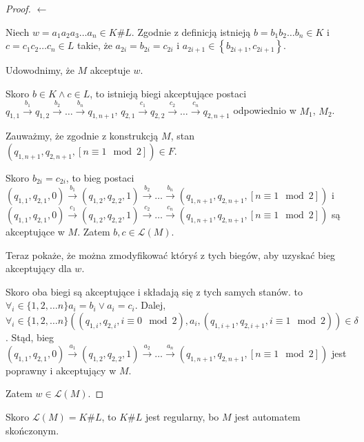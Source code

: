 \documentclass{article}
\theoremstyle{definition}
\theoremstyle{remark}
\begin{document}
\begin{proof}
    \(\leftarrow\)

    Niech \(w = a_1 a_2 a_3\ldots a_n \in K \# L\). Zgodnie z definicją istnieją \(b=b_1 b_2 \ldots b_n \in K\) i \(c=c_1 c_2 \ldots c_n \in L\) takie,
    że \(a_{2i} = b_{2i} = c_{2i}\) i \(a_{2i+1} \in \left\{ b_{2i+1}, c_{2i+1} \right\}\).

    Udowodnimy, że \(M\) akceptuje \(w\).

    Skoro \(b \in K \land c \in L\), to istnieją biegi akceptujące postaci \(q_{1,1} \xrightarrow{b_1} q_{1,2} \xrightarrow{b_2} \ldots \xrightarrow{b_n} q_{1,n+1}\),
    \(q_{2,1} \xrightarrow{c_1} q_{2,2} \xrightarrow{c_2} \ldots \xrightarrow{c_n} q_{2,n+1}\) odpowiednio w \(M_1\), \(M_2\).

    Zauważmy, że zgodnie z konstrukcją \(M\), stan \( \left( q_{1,n+1}, q_{2,n+1}, \left[ n \equiv 1 \mod 2 \right] \right) \in F\).
    
    Skoro \(b_{2i} = c_{2i}\), to bieg postaci
    \( \left(q_{1,1}, q_{2,1}, 0 \right) \xrightarrow{b_1} \left(q_{1,2}, q_{2,2}, 1 \right) \xrightarrow{b_2} \ldots \xrightarrow{b_n} \left(q_{1,n+1}, q_{2,n+1}, \left[ n \equiv 1 \mod 2  \right] \right) \)
    i
    \( \left(q_{1,1}, q_{2,1}, 0 \right) \xrightarrow{c_1} \left(q_{1,2}, q_{2,2}, 1 \right) \xrightarrow{c_2} \ldots \xrightarrow{c_n} \left(q_{1,n+1}, q_{2,n+1}, \left[ n \equiv 1 \mod 2  \right] \right) \)
    są akceptujące w \(M\). Zatem \(b, c \in \mathcal{L}(M)\).
    
    Teraz pokaże, że można zmodyfikować któryś z tych biegów, aby uzyskać bieg akceptujący dla \(w\).

    Skoro oba biegi są akceptujące i składają się z tych samych stanów. to \( \forall_i \in \{1,2,\ldots n\} a_i = b_i \lor a_i = c_i \).
    Dalej, \( \forall_i \in \{1,2,\ldots n\} \left( \left( q_{1,i}, q_{2,i}, i \equiv 0 \mod 2 \right), a_i, \left( q_{1,i+1}, q_{2,i+1}, i \equiv 1 \mod 2 \right)  \right) 
    \in \delta \). Stąd, bieg  \( \left(q_{1,1}, q_{2,1}, 0 \right) \xrightarrow{a_1} \left(q_{1,2}, q_{2,2}, 1 \right) \xrightarrow{a_2} \ldots \xrightarrow{a_n} \left(q_{1,n+1}, q_{2,n+1}, \left[ n \equiv 1 \mod 2  \right] \right) \)
    jest poprawny i akceptujący w \(M\).

    Zatem \(w \in \mathcal{L}(M)\).
\end{proof}

Skoro \(\mathcal{L}(M) = K \# L\), to \(K \# L\) jest regularny, bo \(M\) jest automatem skończonym.
\end{document}
